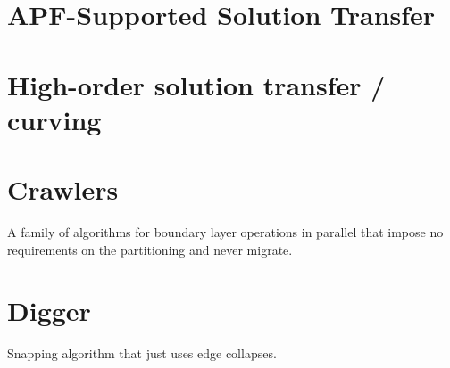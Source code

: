 \documentclass{article}
\begin{document}
\section{APF-Supported Solution Transfer}
\section{High-order solution transfer / curving}
\section{Crawlers}
A family of algorithms for boundary layer operations in parallel
that impose no requirements on the partitioning and never migrate.
\section{Digger}
Snapping algorithm that just uses edge collapses.
\end{document}
